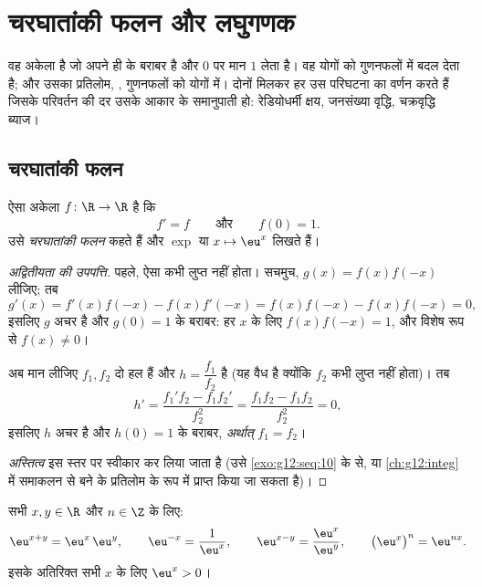 \chapter{चरघातांकी फलन और लघुगणक}\label{ch:g12:exp}

 वह अकेला  है जो अपने ही  के बराबर है और $0$ पर मान $1$
लेता है। वह योगों को गुणनफलों में बदल देता है; और उसका प्रतिलोम, , गुणनफलों को योगों में। दोनों मिलकर हर उस परिघटना का वर्णन करते हैं
जिसके परिवर्तन की दर उसके आकार के समानुपाती हो: रेडियोधर्मी क्षय, जनसंख्या
वृद्धि, चक्रवृद्धि ब्याज।

\section{चरघातांकी फलन}

\begin{theorem}[अस्तित्व और अद्वितीयता]\label{thm:g12:exp:existence}
ऐसा अकेला   $f \colon \R \to \R$ है कि
\[
f' = f \qquad\text{और}\qquad f(0) = 1 .
\]
उसे \emph{चरघातांकी फलन} कहते हैं और $\exp$ या $x \mapsto \eu^x$ लिखते
हैं।
\end{theorem}

\begin{proof}[अद्वितीयता की उपपत्ति]
पहले, ऐसा  कभी लुप्त नहीं होता। सचमुच, $g(x) = f(x)f(-x)$ लीजिए; तब
\[
g'(x) = f'(x)f(-x) - f(x)f'(-x) = f(x)f(-x) - f(x)f(-x) = 0,
\]
इसलिए $g$ अचर है और $g(0) = 1$ के बराबर: हर $x$ के लिए $f(x)f(-x) = 1$, और विशेष रूप से
$f(x) \neq 0$।

अब मान लीजिए $f_1, f_2$ दो हल हैं और $h = \dfrac{f_1}{f_2}$ है (यह वैध है क्योंकि $f_2$ कभी लुप्त
नहीं होता)। तब
\[
h' = \frac{f_1' f_2 - f_1 f_2'}{f_2^2} = \frac{f_1 f_2 - f_1 f_2}{f_2^2} = 0,
\]
इसलिए $h$ अचर है और $h(0) = 1$ के बराबर, \emph{अर्थात्} $f_1 = f_2$।

\emph{अस्तित्व} इस स्तर पर स्वीकार कर लिया जाता है (उसे \cref{exo:g12:seq:10} के  से,
या \cref{ch:g12:integ} में समाकलन से बने  के प्रतिलोम के रूप में प्राप्त किया जा सकता
है)।
\end{proof}

\begin{proposition}\label{prop:g12:exp:funceq}
सभी $x, y \in \R$ और $n \in \Z$ के लिए:
\[
\eu^{x+y} = \eu^x\,\eu^y, \qquad
\eu^{-x} = \frac{1}{\eu^x}, \qquad
\eu^{x-y} = \frac{\eu^x}{\eu^y}, \qquad
\bigl(\eu^{x}\bigr)^n = \eu^{nx}.
\]
इसके अतिरिक्त सभी $x$ के लिए $\eu^x > 0$।
\end{proposition}

